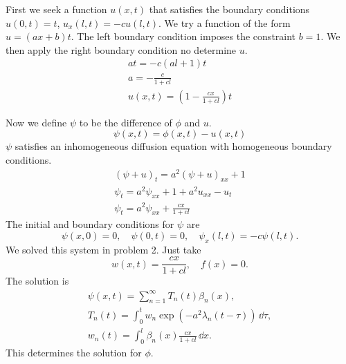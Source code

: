 {%
\begin{Solution}
  \label{solution heat p=t px=-cp}
  First we seek a function $u(x,t)$ that satisfies the boundary conditions
  $u(0,t) = t$, $u_x(l,t) = -c u(l,t)$.  We try a function of the form
  $u = (a x + b) t$.  The left boundary condition imposes the constraint
  $b = 1$.  We then apply the right boundary condition no determine $u$.
  \begin{gather*}
    a t = -c (a l + 1) t \\
    a = - \frac{ c }{ 1 + c l } \\
    u(x,t) = \left( 1 - \frac{ c x }{ 1 + c l } \right) t
  \end{gather*}

  Now we define $\psi$ to be the difference of $\phi$ and $u$.
  \[
  \psi(x,t) = \phi(x,t) - u(x,t)
  \]
  $\psi$ satisfies an inhomogeneous diffusion equation with homogeneous
  boundary conditions.
  \begin{gather*}
    (\psi + u)_t = a^2 (\psi + u)_{x x} + 1 \\
    \psi_t = a^2 \psi_{x x} + 1 + a^2 u_{x x} - u_t \\
    \psi_t = a^2 \psi_{x x} + \frac{ c x }{ 1 + c l }
  \end{gather*}
  The initial and boundary conditions for $\psi$ are
  \[
  \psi(x, 0) = 0, \quad
  \psi(0, t) = 0, \quad
  \psi_x(l,t) = - c \psi(l,t).
  \]
  We solved this system in problem 2.  Just take
  \[
  w(x,t) = \frac{ c x }{ 1 + c l }, \quad
  f(x) = 0.
  \]
  The solution is
  \begin{gather*}
    \psi(x,t) = \sum_{n=1}^\infty T_n(t) \beta_n(x), \\
    T_n(t) = \int_0^t w_n
    \exp \left( - a^2 \lambda_n (t - \tau) \right) \,\dd \tau, \\
    w_n(t) = \int_0^l \beta_n(x) \frac{ c x }{ 1 + c l } \,\dd x.
  \end{gather*}
  This determines the solution for $\phi$.
\end{Solution}





}
